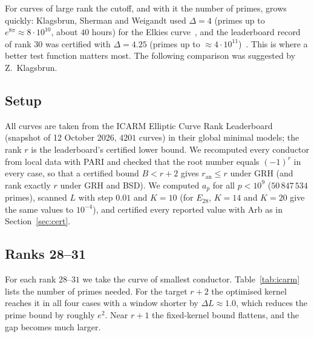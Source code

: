 \documentclass[11pt]{amsart}
\theoremstyle{remark}
\theoremstyle{definition}
\newcommand{\ran}{r_{\mathrm{an}}}
\begin{document}
For curves of large rank the cutoff, and with it the number of primes, grows quickly: Klagsbrun, Sherman and Weigandt used $\Delta=4$ (primes up to $e^{8\pi}\approx 8\cdot10^{10}$, about $40$ hours) for the Elkies curve~\cite{KSW}, and the leaderboard record of rank $30$ was certified with $\Delta=4.25$ (primes up to $\approx4\cdot10^{11}$)~\cite{ICARM}. This is where a better test function matters most. The following comparison was suggested by Z.~Klagsbrun.

\subsection*{Setup}
All curves are taken from the ICARM Elliptic Curve Rank Leaderboard~\cite{ICARM} (snapshot of 12 October 2026, $4201$ curves) in their global minimal models; the rank $r$ is the leaderboard's certified lower bound. We recomputed every conductor from local data with PARI and checked that the root number equals $(-1)^r$ in every case, so that a certified bound $B<r+2$ gives $\ran\le r$ under GRH (and rank exactly $r$ under GRH and BSD). We computed $a_p$ for all $p<10^9$ ($50\,847\,534$ primes), scanned $L$ with step $0.01$ and $K=10$ (for $E_{28}$, $K=14$ and $K=20$ give the same values to $10^{-4}$), and certified every reported value with Arb as in Section~\ref{sec:cert}.

\subsection*{Ranks 28--31}
For each rank $28$--$31$ we take the curve of smallest conductor. Table~\ref{tab:icarm} lists the number of primes needed. For the target $r+2$ the optimised kernel reaches it in all four cases with a window shorter by
$\Delta L\approx1.0$, which reduces the prime bound by roughly $e^{2}$. Near $r+1$ the fixed-kernel bound flattens, and the gap becomes much larger.
\end{document}
